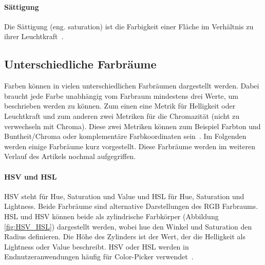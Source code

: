 \documentclass[12pt, a4paper, ngerman]{article}
\begin{document}
\paragraph{Sättigung}
Die Sättigung (eng. saturation) ist die Farbigkeit einer Fläche im Verhältnis zu ihrer Leuchtkraft~\cite{Darktable_2023}.


\subsection{Unterschiedliche Farbräume}
Farben können in vielen unterschiedlichen Farbräumen dargestellt werden. 
Dabei braucht jede Farbe unabhängig vom Farbraum mindestens drei Werte, um beschrieben werden zu können.
Zum einen eine Metrik für Helligkeit oder Leuchtkraft und zum anderen zwei Metriken für die Chromazität 
(nicht zu verwechseln mit Chroma). 
Diese zwei Metriken können zum Beispiel Farbton und Buntheit/Chroma oder komplementäre Farbkoordinaten sein~\cite{Darktable_2023}.
Im Folgenden werden einige Farbräume kurz vorgestellt. Diese Farbräume werden im weiteren Verlauf des Artikels nochmal aufgegriffen.

\paragraph{HSV und HSL}
\acs{HSV} steht für Hue, Saturation und Value und \acs{HSL} für Hue, Saturation und Lightness.
Beide Farbräume sind alternative Darstellungen des RGB Farbraums. 
HSL und HSV können beide als zylindrische Farbkörper (Abbildung \ref{fig:HSV_HSL}) dargestellt werden, 
wobei hue den Winkel und Saturation den Radius definieren.
Die Höhe des Zylinders ist der Wert, der die Helligkeit als Lightness oder Value beschreibt.
HSV oder HSL werden in Endnutzeranwendungen häufig für Color-Picker verwendet~\cite{HSL_and_HSV_2023}.
\end{document}
